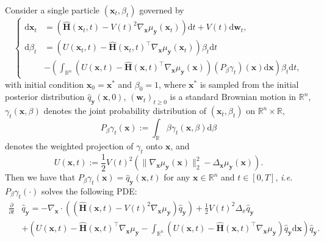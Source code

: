 \documentclass[10pt,a4paper]{amsart}
\newcommand{\dif}{{\mathrm{d}}}
\def\mH{{\bm{H}}}
\def\vw{{\bm{w}}}
\def\vx{{\bm{x}}}
\def\vy{{\bm{y}}}
\begin{document}
\begin{lemma}
    \label{lem: derivation of single particle dynamics}    
    Consider a single particle $(\vx_t,\beta_t)$ governed by
    \begin{equation}
    \label{eqn: PDE soln via single particle app} 
    \begin{cases}
    \dif \vx_t &= \left(\widehat{\mH}(\vx_t,t)-V(t)^2\nabla_{\vx}\mu_{\vy}(\vx_t)\right)\dif t + V(t)\dif \vw_t,\\
    \dif \beta_t &= \left(U(\vx_t,t) - \widehat{\mH}(\vx_t,t)^\intercal\nabla_{\vx}\mu_{\vy}(\vx_t)\right)\beta_t \dif t \\
    &- \left(\displaystyle\int_{\mathbb{R}^n}\left(U(\vx,t) - \widehat{\mH}(\vx,t)^\intercal\nabla_{\vx}\mu_{\vy}(\vx)\right)\left(P_{\beta}\gamma_t\right)(\vx)\dif \vx\right)\beta_t \dif t,    
    \end{cases}
    \end{equation}
    with initial condition $\vx_0 = \vx^\ast$ and $\beta_0 = 1$, where $\vx^\ast$ is sampled from the initial posterior distribution $\widehat{q}_{\vy}(\vx,0)$, $(\vw_t)_{t\geq 0}$ is a standard Brownian motion in $\mathbb{R}^n$, $\gamma_t(\vx,\beta)$ denotes the joint probability distribution of $(\vx_t,\beta_t)$ on $\mathbb{R}^n \times \mathbb{R}$, 
    $$
        P_{\beta}\gamma_t(\vx) := \int_{\mathbb{R}}\beta\gamma_{t}(\vx,\beta)\dif\beta
    $$ 
    denotes the weighted projection of $\gamma_t$ onto $\vx$, and 
    $$
        U(\vx,t) := \frac{1}{2}V(t)^2\left(\|\nabla_{\vx}\mu_{\vy}(\vx)\|_2^2-\Delta_{\vx}\mu_{\vy}(\vx)\right).
    $$ 
    Then we have that $P_{\beta}\gamma_t(\vx) = \widehat{q}_{\vy}(\vx,t)$ for any $\vx \in \mathbb{R}^n$ and $t \in [0,T]$, \emph{i.e.} $P_{\beta}\gamma_t(\cdot)$ solves the following PDE:
    \begin{equation}
            \label{eqn: PDE of posterior diffusion app2}
            \begin{aligned}
            \frac{\partial}{\partial t}&\widehat{q}_{\vy} = -\nabla_{\vx} \cdot \left(\left(\widehat{\mH}(\vx,t)-V(t)^2\nabla_{\vx}\mu_{\vy}\right)\widehat{q}_{\vy}\right)
            +\frac{1}{2}V(t)^2\Delta_{x}\widehat{q}_{\vy}\\
            &+\left(U(\vx,t) - \widehat{\mH}(\vx,t)^\intercal\nabla_{\vx}\mu_{\vy} - \int_{\mathbb{R}^n}\left(U(\vx,t) - \widehat{\mH}(\vx,t)^\intercal\nabla_{\vx}\mu_{\vy}\right)\widehat{q}_{\vy}\dif \vx\right)\widehat{q}_{\vy}.
            \end{aligned}
        \end{equation}
\end{lemma}
\end{document}
